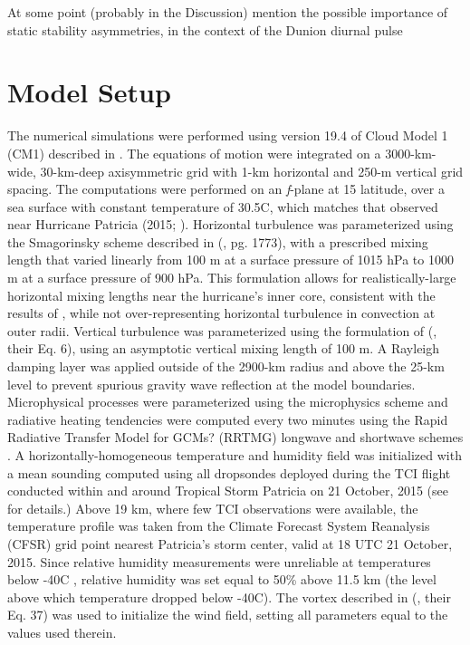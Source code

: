 \documentclass{ametsoc}
\begin{document}
At some point (probably in the Discussion) mention the possible importance of static stability asymmetries, in the context of the Dunion diurnal pulse 

 \section{Model Setup}

The numerical simulations were performed using version 19.4 of Cloud Model 1 (CM1) described in \cite{BryanRotunno2009}.
The equations of motion were integrated on a 3000-km-wide, 30-km-deep axisymmetric grid with 1-km horizontal and 250-m vertical grid spacing.
The computations were performed on an \textit{f}-plane at 15 latitude, over a sea surface with constant temperature of 30.5\textdegree C, which matches that observed near Hurricane Patricia (2015; \citeauthor{Kimberlainetal2016} \citeyear{Kimberlainetal2016}).
Horizontal turbulence was parameterized using the Smagorinsky scheme described in \citeauthor{BryanRotunno2009} (\citeyear{BryanRotunno2009}, pg. 1773), with a prescribed mixing length that varied linearly from 100 m at a surface pressure of 1015 hPa to 1000 m at a surface pressure of 900 hPa.
This formulation allows for realistically-large horizontal mixing lengths near the hurricane's inner core, consistent with the results of \cite{Bryan2012}, while not over-representing horizontal turbulence in convection at outer radii.
Vertical turbulence was parameterized using the formulation of \citeauthor{MarkowskiBryan2016} (\citeyear{MarkowskiBryan2016}, their Eq. 6), using an asymptotic vertical mixing length of 100 m.
A Rayleigh damping layer was applied outside of the 2900-km radius and above the 25-km level to prevent spurious gravity wave reflection at the model boundaries.
Microphysical processes were parameterized using the \cite{Thompson} microphysics scheme and radiative heating tendencies were computed every two minutes using the Rapid Radiative Transfer Model for GCMs? (RRTMG) longwave and shortwave schemes \citep{Iacono}.
A horizontally-homogeneous temperature and humidity field was initialized with a mean sounding computed using all dropsondes deployed during the TCI flight conducted within and around Tropical Storm Patricia on 21 October, 2015 (see \citeauthor{DoyleTCI} \citeyear{DoyleTCI} for details.)
Above 19 km, where few TCI observations were available, the temperature profile was taken from the Climate Forecast System Reanalysis (CFSR) grid point nearest Patricia's storm center, valid at 18 UTC 21 October, 2015.
Since relative humidity measurements were unreliable at temperatures below -40\textdegree C \citep{BellTCI}, relative humidity was set equal to 50\% above 11.5 km (the level above which temperature dropped below -40\textdegree C).
The vortex described in \citeauthor{RotunnoEmanuel} (\citeyear{RotunnoEmanuel}, their Eq. 37) was used to initialize the wind field, setting all parameters equal to the values used therein.
\end{document}
